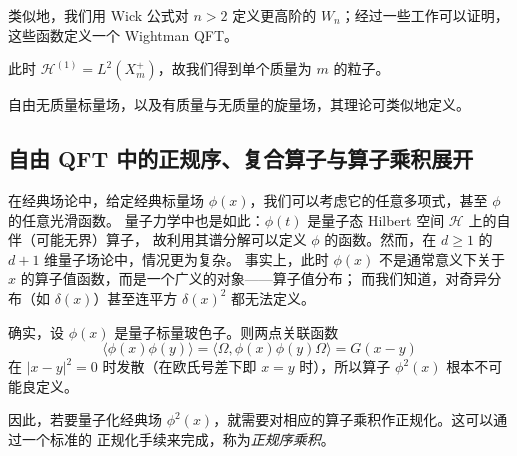 类似地，我们用 Wick 公式对 $n>2$ 定义更高阶的 $W_n$；经过一些工作可以证明，这些函数定义一个
Wightman QFT。

此时 $\mathcal H^{(1)}=L^2(X_m^+)$，故我们得到单个质量为 $m$ 的粒子。

自由无质量标量场，以及有质量与无质量的旋量场，其理论可类似地定义。


\subsection{自由 QFT 中的正规序、复合算子与算子乘积展开}\label{compop}

在经典场论中，给定经典标量场 $\phi(x)$，我们可以考虑它的任意多项式，甚至 $\phi$ 的任意光滑函数。
量子力学中也是如此：$\phi(t)$ 是量子态 Hilbert 空间 $\mathcal H$ 上的自伴（可能无界）算子，
故利用其谱分解可以定义 $\phi$ 的函数。然而，在 $d\ge 1$ 的 $d+1$ 维量子场论中，情况更为复杂。
事实上，此时 $\phi(x)$ 不是通常意义下关于 $x$ 的算子值函数，而是一个广义的对象——算子值分布；
而我们知道，对奇异分布（如 $\delta(x)$）甚至连平方 $\delta(x)^2$ 都无法定义。

确实，设 $\phi(x)$ 是量子标量玻色子。则两点关联函数
$$
\langle\phi(x)\phi(y)\rangle=\langle \Omega,\phi(x)\phi(y)\Omega\rangle=G(x-y)
$$
在 $|x-y|^2=0$ 时发散（在欧氏号差下即 $x=y$ 时），所以算子 $\phi^2(x)$ 根本不可能良定义。

因此，若要量子化经典场 $\phi^2(x)$，就需要对相应的算子乘积作正规化。这可以通过一个标准的
正规化手续来完成，称为\emph{正规序乘积}。\label{Normally ordered product} 

